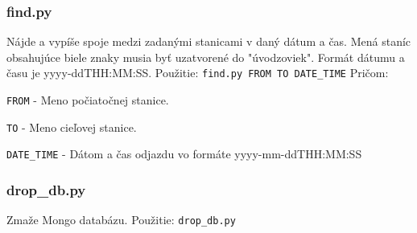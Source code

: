 \documentclass[10pt,xcolor=pdflatex,dvipsnames,table,oneside]{book}
\begin{document}
\subsubsection*{find.py}
\par Nájde a vypíše spoje medzi zadanými stanicami v daný dátum a čas. Mená staníc obsahujúce biele znaky musia byť uzatvorené do "úvodzoviek". Formát dátumu a času je yyyy-ddTHH:MM:SS. \newline \newline
Použitie: \verb|find.py FROM TO DATE_TIME|
\newline \newline
Pričom:
\newline
\par \verb|FROM| - Meno počiatočnej stanice.
\newline
\par \verb|TO| - Meno cieľovej stanice.
\newline
\par \verb|DATE_TIME| - Dátom a čas odjazdu vo formáte yyyy-mm-ddTHH:MM:SS
\newline

\subsubsection*{drop\_db.py}
\par Zmaže Mongo databázu.
\newline \newline
Použitie: \verb|drop_db.py|










\end{document}
